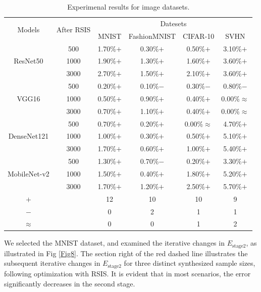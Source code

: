 \documentclass[final,3p,times]{elsarticle}
\begin{document}
\begin{table}[t!]
  \centering
  \begin{threeparttable}
    \caption{Experimenal results for image datasets.}\label{tab5}
  \begin{tabular}{cccccc}
  \toprule
  \multirow{2}{*}{Models} & \multirow{2}{*}{After RSIS} & \multicolumn{4}{c}{Datesets}  \\ 
  \cmidrule{3-6}
    &  & MNIST & FashionMNIST & CIFAR-10 & SVHN \\
  \cmidrule{1-6}
  \multirow{3}{*}{ResNet50} & 500 & 1.70\%$+$ & 0.30\%$+$ & 0.50\%$+$ & 3.10\%$+$ \\
    & 1000 & 1.90\%$+$ & 1.30\%$+$ & 1.60\%$+$ & 3.60\%$+$ \\
    & 3000 & 2.70\%$+$ & 1.50\%$+$ & 2.10\%$+$ & 3.60\%$+$ \\
  \cmidrule{2-6}
  \multirow{3}{*}{VGG16} & 500 & 0.20\%$+$ & 0.10\%$-$ & 0.30\%$-$ & 0.80\%$-$ \\
    & 1000 & 0.50\%$+$ & 0.90\%$+$ & 0.40\%$+$ & 0.00\%$\approx$ \\
    & 3000 & 0.70\%$+$ & 1.10\%$+$ & 0.40\%$+$ & 0.00\%$\approx$ \\
  \cmidrule{2-6}
  \multirow{3}{*}{DenseNet121} & 500 & 0.70\%$+$ & 0.20\%$+$ & 0.00\%$\approx$ & 4.70\%$+$ \\
    & 1000 & 1.00\%$+$ & 0.30\%$+$ & 0.50\%$+$ & 5.10\%$+$ \\
    & 3000 & 1.70\%$+$ & 0.60\%$+$ & 1.00\%$+$ & 5.40\%$+$ \\
  \cmidrule{2-6}
  \multirow{3}{*}{MobileNet-v2} & 500 & 1.30\%$+$ & 0.70\%$-$ & 0.20\%$+$ & 3.30\%$+$ \\
    & 1000 & 1.50\%$+$ & 0.40\%$+$ & 1.80\%$+$ & 5.20\%$+$ \\
    & 3000 & 1.70\%$+$ & 1.20\%$+$ & 2.50\%$+$ & 5.70\%$+$ \\
  \cmidrule{1-6}
  $+$ &  & 12 & 10 & 10 & 9 \\
  $-$ &  & 0  & 2  & 1  & 1 \\
  $\approx$ &  & 0 & 0 & 1 &2 \\
  \bottomrule
  \end{tabular}
  \end{threeparttable}
\end{table}


We selected the MNIST dataset, and examined the iterative changes 
in $E_{\text{stage2}}$, as illustrated in Fig \ref{Fig8}. The section 
right of the red dashed line illustrates the subsequent iterative 
changes in $E_{\text{stage2}}$ for three distinct synthesized 
sample sizes, following optimization with RSIS. It is evident 
that in most scenarios, the error significantly decreases in the 
second stage.
\end{document}
